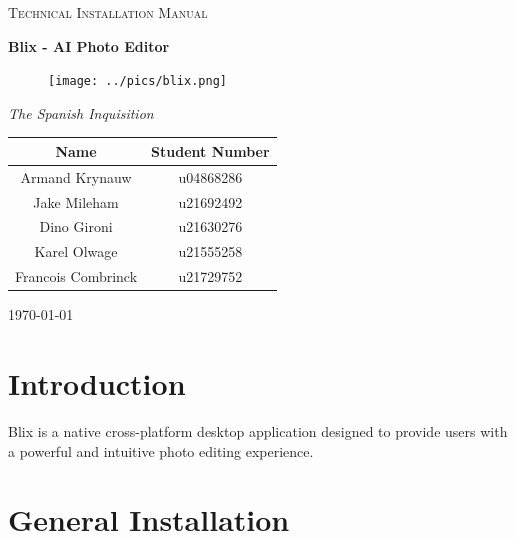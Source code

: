 \documentclass[11pt,a4paper]{article}
\begin{document}
\begin{titlepage}
	\centering
    {\scshape\LARGE Technical Installation Manual\par}
    \vspace{1.5cm}
    {\huge\bfseries Blix - AI Photo Editor\par}
    \begin{figure}[h]
        \centering %
        \texttt{[image: ../pics/blix.png]}
    \end{figure}
    \vspace{2.5cm}
    {\Large\itshape The Spanish Inquisition\par}
	\begin{tabular}{|c|c|}
		\hline
		\textbf{Name} 		& \textbf{Student Number} \\
		\hline
		Armand Krynauw		& u04868286  \\
		Jake Mileham		& u21692492  \\
		Dino Gironi			& u21630276  \\
		Karel Olwage		& u21555258  \\
		Francois Combrinck	& u21729752  \\
		\hline
	\end{tabular}
    \vfill
    {\large \today\par}
\end{titlepage}

\tableofcontents
\pagebreak


\section*{Introduction}

Blix is a native cross-platform desktop application designed to provide users
with a powerful and intuitive photo editing experience.

\section*{General Installation}
\end{document}
